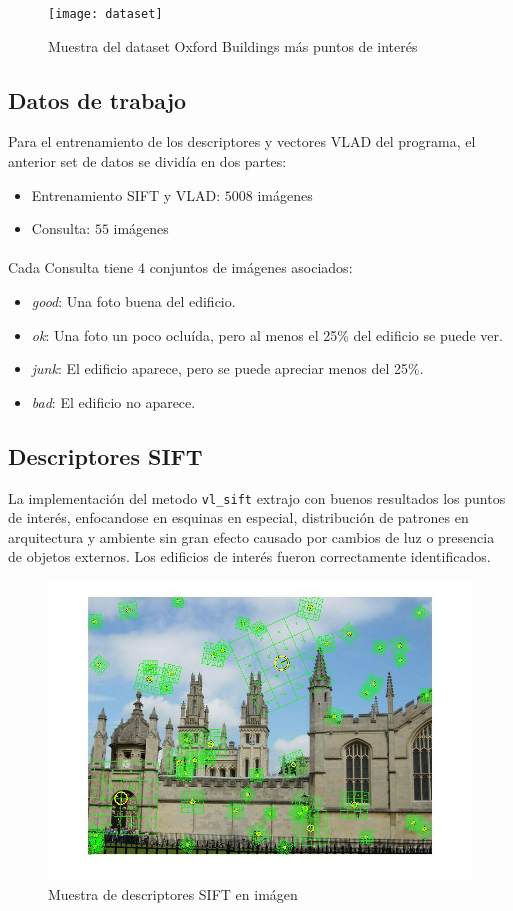 \begin{figure}[htb]
  \centering
  \texttt{[image: dataset]}
  \caption{Muestra del dataset Oxford Buildings más puntos de interés}
  \label{fig:dataset}
\end{figure}

\subsection{Datos de trabajo}
Para el entrenamiento de los descriptores y vectores VLAD del programa, el anterior set de datos se dividía en dos partes:
\begin{itemize}
  \item Entrenamiento SIFT y VLAD: $5008$ imágenes
  \item Consulta: $55$ imágenes
\end{itemize}

\paragraph{}
Cada Consulta tiene $4$ conjuntos de imágenes asociados:
\begin{itemize}
  \item \emph{good}: Una foto buena del edificio.
  \item \emph{ok}: Una foto un poco ocluída, pero al menos el 25\% del edificio se puede ver.
  \item \emph{junk}: El edificio aparece, pero se puede apreciar menos del 25\%.
  \item \emph{bad}: El edificio no aparece.
\end{itemize}


\subsection{Descriptores SIFT}
La implementación del metodo \texttt{vl\_sift} extrajo con buenos resultados los puntos de interés, enfocandose en esquinas en especial, distribución de patrones en arquitectura y ambiente sin gran efecto causado por cambios de luz o presencia de objetos externos. Los edificios de interés fueron correctamente identificados.
\begin{figure}[htb]
  \centering
  \includegraphics[width=.9\linewidth]{siftSample}
  \caption{Muestra de descriptores SIFT en imágen}
  \label{fig:siftSample}
\end{figure}


